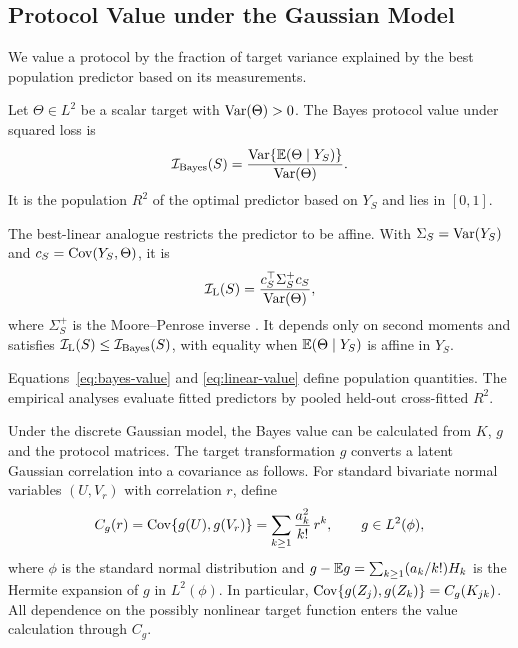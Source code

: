 \subsection{Protocol Value under the Gaussian Model}
\label{sec:protocol-values}

We value a protocol by the fraction of target variance explained by the best
population predictor based on its measurements.

\begin{definition}
\label{def:values}
Let $\Theta\in L^2$ be a scalar target with $\operatorname{Var}(\Theta)>0$. The Bayes protocol
value under squared loss is
\begin{equation}
\mathcal{I}_{\mathrm{Bayes}}(S)=\frac{\operatorname{Var}\{\mathbb{E}(\Theta\mid Y_S)\}}{\operatorname{Var}(\Theta)}.
\label{eq:bayes-value}
\end{equation}
It is the population $R^2$ of the optimal predictor based on $Y_S$ and lies in
$[0,1]$.
\end{definition}

The best-linear analogue restricts the predictor to be affine. With
$\Sigma_S=\operatorname{Var}(Y_S)$ and $c_S=\operatorname{Cov}(Y_S,\Theta)$, it is
\begin{equation}
\mathcal{I}_{\mathrm L}(S)=\frac{c_S^\top\Sigma_S^{+}c_S}{\operatorname{Var}(\Theta)},
\label{eq:linear-value}
\end{equation}
where $\Sigma_S^{+}$ is the Moore--Penrose inverse
\citep{penrose1955generalized}.
It depends only on second moments and satisfies
$\mathcal{I}_{\mathrm L}(S)\le\mathcal{I}_{\mathrm{Bayes}}(S)$, with equality when
$\mathbb{E}(\Theta\mid Y_S)$ is affine in $Y_S$.

Equations~\eqref{eq:bayes-value} and \eqref{eq:linear-value} define population
quantities. The empirical analyses evaluate fitted predictors by pooled
held-out cross-fitted $R^2$.

Under the discrete Gaussian model, the Bayes value can be calculated from $K$,
$g$ and the protocol matrices. The target transformation $g$ converts a latent
Gaussian correlation into a covariance as follows. For standard bivariate
normal variables
$(U,V_r)$ with correlation $r$, define
\begin{equation}
C_g(r)=\operatorname{Cov}\{g(U),g(V_r)\}
=\sum_{k\ge1}\frac{a_k^2}{k!}\,r^k,
\qquad g\in L^2(\phi),
\label{eq:Cg}
\end{equation}
where $\phi$ is the standard normal distribution and
$g-\mathbb{E} g=\sum_{k\ge1}(a_k/k!)H_k$ is the Hermite expansion of $g$ in
$L^2(\phi)$. In particular,
$\operatorname{Cov}\{g(Z_j),g(Z_k)\}=C_g(K_{jk})$. All dependence on the possibly nonlinear
target function enters the value calculation through $C_g$.


